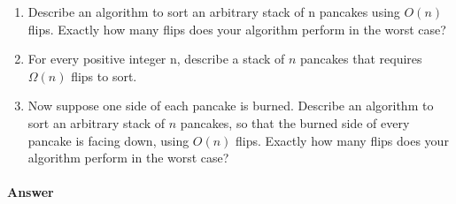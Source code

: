 \documentclass{article}
\begin{document}
\begin{enumerate}[label=\alph*.]
    \item Describe an algorithm to sort an arbitrary stack of n pancakes using $O(n)$ flips.
    Exactly how many flips does your algorithm perform in the worst case?
    \item For every positive integer n, describe a stack of $n$ pancakes that requires $\Omega (n)$ flips to sort.
    \item Now suppose one side of each pancake is burned.
    Describe an algorithm to sort an arbitrary stack of $n$ pancakes, so that the burned side of every pancake is facing down, using $O(n)$ flips.
    Exactly how many flips does your algorithm perform in the worst case?
\end{enumerate}

\paragraph{Answer}

\end{document}
